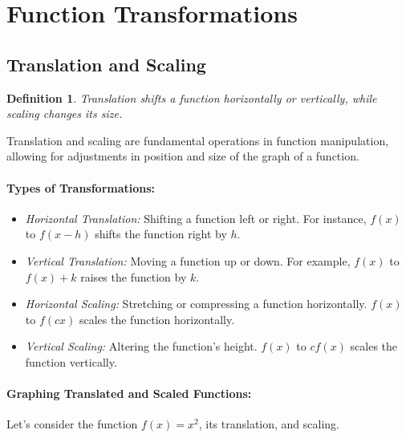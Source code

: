 \documentclass[a4paper,12pt]{book}
\newcounter{example}
\newtheorem{definition}{Definition}
\begin{document}
\section{Function Transformations}
\subsection{Translation and Scaling}
\begin{definition}
Translation shifts a function horizontally or vertically, while scaling changes its size.
\end{definition}

Translation and scaling are fundamental operations in function manipulation, allowing for adjustments in position and size of the graph of a function.

\paragraph{Types of Transformations:}
\begin{itemize}
    \item \textit{Horizontal Translation:} Shifting a function left or right. For instance, \( f(x) \) to \( f(x - h) \) shifts the function right by \( h \).
    \item \textit{Vertical Translation:} Moving a function up or down. For example, \( f(x) \) to \( f(x) + k \) raises the function by \( k \).
    \item \textit{Horizontal Scaling:} Stretching or compressing a function horizontally. \( f(x) \) to \( f(cx) \) scales the function horizontally.
    \item \textit{Vertical Scaling:} Altering the function's height. \( f(x) \) to \( cf(x) \) scales the function vertically.
\end{itemize}

\paragraph{Graphing Translated and Scaled Functions:}
Let's consider the function \( f(x) = x^2 \), its translation, and scaling.

\end{document}
